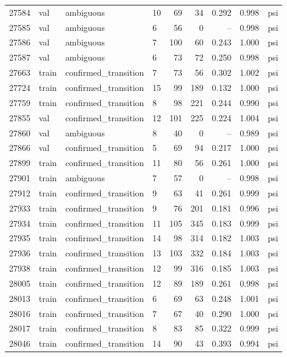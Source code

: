 \begin{longtable}{rlllrrrrl}
27584 & val & ambiguous & 10 & 69 & 34 & 0.292 & 0.998 & psi \\
27585 & val & ambiguous & 6 & 56 & 0 & -- & 0.998 & psi \\
27586 & val & ambiguous & 7 & 100 & 60 & 0.243 & 1.000 & psi \\
27587 & val & ambiguous & 6 & 73 & 72 & 0.250 & 0.998 & psi \\
27663 & train & confirmed\_transition & 7 & 73 & 56 & 0.302 & 1.002 & psi \\
27724 & train & confirmed\_transition & 15 & 99 & 189 & 0.132 & 1.000 & psi \\
27759 & train & confirmed\_transition & 8 & 98 & 221 & 0.244 & 0.990 & psi \\
27855 & val & confirmed\_transition & 12 & 101 & 225 & 0.224 & 1.004 & psi \\
27860 & val & ambiguous & 8 & 40 & 0 & -- & 0.989 & psi \\
27866 & val & confirmed\_transition & 5 & 69 & 94 & 0.217 & 1.000 & psi \\
27899 & train & confirmed\_transition & 11 & 80 & 56 & 0.261 & 1.000 & psi \\
27901 & train & ambiguous & 7 & 57 & 0 & -- & 0.998 & psi \\
27912 & train & confirmed\_transition & 9 & 63 & 41 & 0.261 & 0.999 & psi \\
27933 & train & confirmed\_transition & 9 & 76 & 201 & 0.181 & 0.996 & psi \\
27934 & train & confirmed\_transition & 11 & 105 & 345 & 0.183 & 0.999 & psi \\
27935 & train & confirmed\_transition & 14 & 98 & 314 & 0.182 & 1.003 & psi \\
27936 & train & confirmed\_transition & 13 & 103 & 332 & 0.184 & 1.003 & psi \\
27938 & train & confirmed\_transition & 12 & 99 & 316 & 0.185 & 1.003 & psi \\
28005 & train & confirmed\_transition & 12 & 89 & 189 & 0.261 & 0.998 & psi \\
28013 & train & confirmed\_transition & 6 & 69 & 63 & 0.248 & 1.001 & psi \\
28016 & train & confirmed\_transition & 7 & 67 & 40 & 0.290 & 1.000 & psi \\
28017 & train & confirmed\_transition & 8 & 83 & 85 & 0.322 & 0.999 & psi \\
28046 & train & confirmed\_transition & 14 & 90 & 43 & 0.393 & 0.994 & psi \\

\end{longtable}
